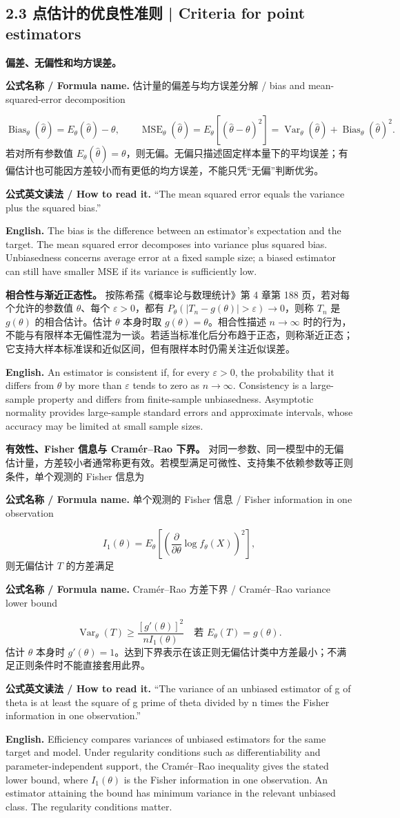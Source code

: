 \documentclass[UTF8,11pt,a4paper]{ctexart}
\newcommand{\EN}[1]{\par\noindent\textbf{English.} #1\par}
\newcommand{\READ}[1]{\par\noindent\textbf{公式英文读法 / How to read it.} #1\par}
\newcommand{\FORMULA}[2]{\par\noindent\textbf{公式名称 / Formula name.} #1 / #2\par}
\begin{document}
\subsection*{2.3 点估计的优良性准则 | Criteria for point estimators}
\noindent\textbf{偏差、无偏性和均方误差。}
\FORMULA{估计量的偏差与均方误差分解}{bias and mean-squared-error decomposition}
\[
\operatorname{Bias}_\theta(\hat\theta)=E_\theta(\hat\theta)-\theta,\qquad
\operatorname{MSE}_\theta(\hat\theta)=E_\theta[(\hat\theta-\theta)^2]
=\operatorname{Var}_\theta(\hat\theta)+\operatorname{Bias}_\theta(\hat\theta)^2.
\]
若对所有参数值 $E_\theta(\hat\theta)=\theta$，则无偏。无偏只描述固定样本量下的平均误差；有偏估计也可能因方差较小而有更低的均方误差，不能只凭“无偏”判断优劣。
\READ{“The mean squared error equals the variance plus the squared bias.”}
\EN{The bias is the difference between an estimator's expectation and the target. The mean squared error decomposes into variance plus squared bias. Unbiasedness concerns average error at a fixed sample size; a biased estimator can still have smaller MSE if its variance is sufficiently low.}

\noindent\textbf{相合性与渐近正态性。} 按陈希孺《概率论与数理统计》第 4 章第 188 页，若对每个允许的参数值 $\theta$、每个 $\varepsilon>0$，都有 $P_\theta(|T_n-g(\theta)|>\varepsilon)\to0$，则称 $T_n$ 是 $g(\theta)$ 的相合估计。估计 $\theta$ 本身时取 $g(\theta)=\theta$。相合性描述 $n\to\infty$ 时的行为，不能与有限样本无偏性混为一谈。若适当标准化后分布趋于正态，则称渐近正态；它支持大样本标准误和近似区间，但有限样本时仍需关注近似误差。
\EN{An estimator is consistent if, for every $\varepsilon>0$, the probability that it differs from $\theta$ by more than $\varepsilon$ tends to zero as $n\to\infty$. Consistency is a large-sample property and differs from finite-sample unbiasedness. Asymptotic normality provides large-sample standard errors and approximate intervals, whose accuracy may be limited at small sample sizes.}

\noindent\textbf{有效性、Fisher 信息与 Cramér--Rao 下界。} 对同一参数、同一模型中的无偏估计量，方差较小者通常称更有效。若模型满足可微性、支持集不依赖参数等正则条件，单个观测的 Fisher 信息为
\FORMULA{单个观测的 Fisher 信息}{Fisher information in one observation}
\[
I_1(\theta)=E_\theta\left[\left(\frac{\partial}{\partial\theta}\log f_\theta(X)\right)^2\right],
\]
则无偏估计 $T$ 的方差满足
\FORMULA{Cramér--Rao 方差下界}{Cramér--Rao variance lower bound}
\[
\operatorname{Var}_\theta(T)\ge\frac{[g'(\theta)]^2}{nI_1(\theta)}
\quad\text{若 }E_\theta(T)=g(\theta).
\]
估计 $\theta$ 本身时 $g'(\theta)=1$。达到下界表示在该正则无偏估计类中方差最小；不满足正则条件时不能直接套用此界。
\READ{“The variance of an unbiased estimator of g of theta is at least the square of g prime of theta divided by n times the Fisher information in one observation.”}
\EN{Efficiency compares variances of unbiased estimators for the same target and model. Under regularity conditions such as differentiability and parameter-independent support, the Cramér--Rao inequality gives the stated lower bound, where $I_1(\theta)$ is the Fisher information in one observation. An estimator attaining the bound has minimum variance in the relevant unbiased class. The regularity conditions matter.}
\end{document}
